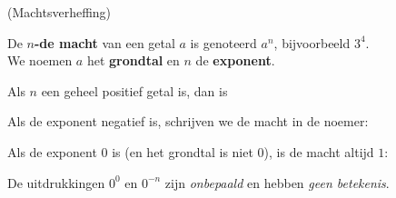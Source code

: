 \documentclass{ximera}
\begin{document}
	\author{Wiskundeplan}



\begin{definition}(Machtsverheffing) \label{def:machten_light}\label{def:machten met gehele exponent}\
    
        
    De \textbf{$n$-de macht} van een getal $a$ is genoteerd $a^n$, bijvoorbeeld $3^4$. \\
    We noemen $a$ het \textbf{grondtal} en $n$ de \textbf{exponent}.
    
    Als $n$ een geheel positief getal is, dan is
    
            
    Als de exponent negatief is, schrijven we de macht in de noemer:
    
    
    Als de exponent 0 is (en het grondtal is niet 0), is de macht altijd $1$:
    
    De uitdrukkingen $0^0$ en $0^{-n}$ zijn \textit{onbepaald} en hebben \textit{geen betekenis}.
        
\end{definition}
\end{document}
